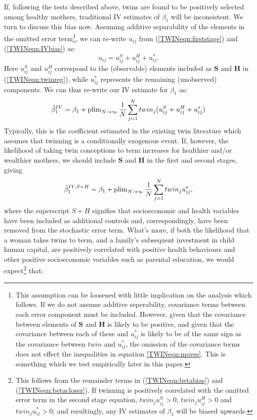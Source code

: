 If, following the tests described above, twins are found to be positively selected
among healthy mothers, traditional IV estimates of $\beta_1$ will be inconsistent.
We turn to discuss this bias now.
Assuming additive separability of the elements in the omitted error term\footnote{%
This assumption can be loosened with little implication on the analysis which
follows.  If we do not assume additive seperability, covariance terms between each
error component must be included.  However, given that the covariance between 
elements of $\bm{S}$ and $\bm{H}$ is likely to be positive, and given that the 
covariance between each of these and $u^*_{ij}$ is likely to be of the same sign
as the covariance between $twin$ and $u^*_{ij}$, the omission of the covariance
terms does not effect the inequalities in equation \ref{TWINeqn:moves}.  This is
something which we test empirically later in this paper.}, we can 
re-write $u_{ij}$ from (\ref{TWINeqn:firststage}) and (\ref{TWINeqn:IVbias}) as:
\[ u_{ij}=u^S_{ij}+u^H_{ij}+u^*_{ij}. \]
Here $u^S_{ij}$ and $u^H_{ij}$ correspond to the (observable) elements included 
as $\bm{S}$ and $\bm{H}$ in (\ref{TWINeqn:twinreg}), while $u^*_{ij}$ represents 
the remaining (unobserved) components.  We can thus re-write our IV estimate for 
$\beta_1$ as:
\begin{equation}
\label{TWINeqn:betabias}
\hat\beta_1^{IV} = \beta_1 + 
\operatorname{plim}_{N\to \infty} \frac{1}{N}\sum_{j=1}^N twin_j(u^S_{ij}+u^H_{ij}+u^*_{ij})
\end{equation}
Typically, this is the coefficient estimated in the existing twin literature 
which assumes that twinning is a conditionally exogenous event.  If, however, the 
likelihood of taking twin conceptions to term increases for healthier and/or 
wealthier mothers, we should include $\bm{S}$ and $\bm{H}$ in the first and 
second stages, giving
\begin{equation}
\label{TWINeqn:betacloser}
\hat\beta_1^{IV,S+H} = \beta_1 +
\operatorname{plim}_{N\to \infty} \frac{1}{N}\sum_{j=1}^N twin_ju^*_{ij},
\end{equation}
where the superscript $S+H$ signifies that socioeconomic and health variables 
have been included as additional controls and, correspondingly, have been 
removed from the stochastic error term.  What's more, if both the likelihood
that a woman takes twins to term, and a family's subsequent investment in child 
human capital, are positively correlated with positive health behaviours and 
other positive socioeconomic variables such as parental education, we would 
expect\footnote{This follows from the remainder terms in 
(\ref{TWINeqn:betabias}) and (\ref{TWINeqn:betacloser}). If twinning is 
positively correlated with the omitted error term in the second stage equation, 
$twin_ju_{ij}^S>0$, $twin_ju_{ij}^H>0$ and $twin_ju_{ij}^*>0$, and resultingly, 
any IV estimates of $\beta_1$ will be biased upwards.} that:
